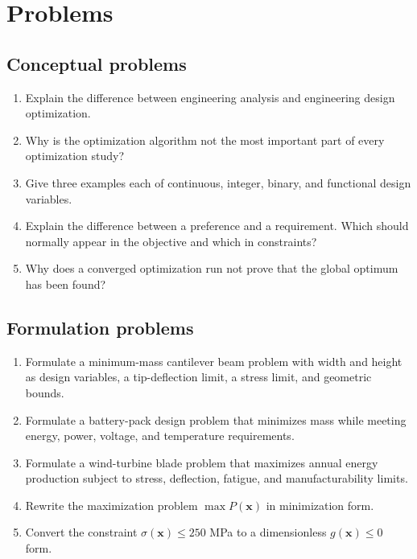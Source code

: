 \documentclass[11pt]{article}
\newcommand{\vect}[1]{\boldsymbol{#1}}
\newcommand{\des}{\vect{x}}
\begin{document}
\section{Problems}

\subsection*{Conceptual problems}
\begin{enumerate}[leftmargin=1.5em,label=\textbf{P\arabic*.}]
  \item Explain the difference between engineering analysis and engineering design optimization.
  \item Why is the optimization algorithm not the most important part of every optimization study?
  \item Give three examples each of continuous, integer, binary, and functional design variables.
  \item Explain the difference between a preference and a requirement. Which should normally appear in the objective and which in constraints?
  \item Why does a converged optimization run not prove that the global optimum has been found?
\end{enumerate}

\subsection*{Formulation problems}
\begin{enumerate}[leftmargin=1.5em,label=\textbf{P\arabic*.},resume]
  \item Formulate a minimum-mass cantilever beam problem with width and height as design variables, a tip-deflection limit, a stress limit, and geometric bounds.
  \item Formulate a battery-pack design problem that minimizes mass while meeting energy, power, voltage, and temperature requirements.
  \item Formulate a wind-turbine blade problem that maximizes annual energy production subject to stress, deflection, fatigue, and manufacturability limits.
  \item Rewrite the maximization problem $\max P(\des)$ in minimization form.
  \item Convert the constraint $\sigma(\des)\leq 250$ MPa to a dimensionless $g(\des)\leq0$ form.
\end{enumerate}
\end{document}
